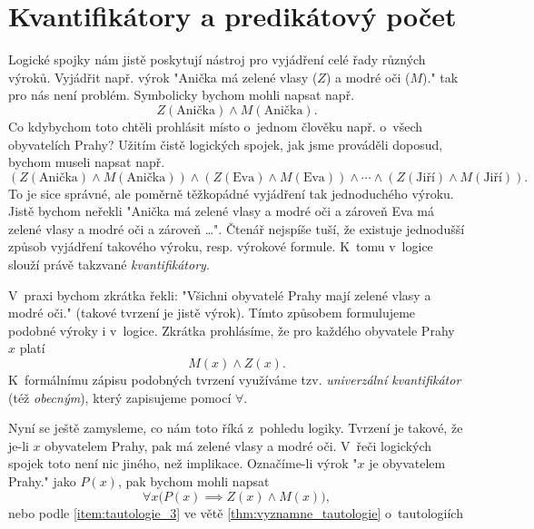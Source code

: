 \section{Kvantifikátory a predikátový počet}\label{sec:kvantifikatory_a_pred_pocet}

Logické spojky nám jistě poskytují nástroj pro vyjádření celé řady různých výroků. Vyjádřit např. výrok "Anička má zelené vlasy ($Z$) a modré oči ($M$)." tak pro nás není problém. Symbolicky bychom mohli napsat např.
\begin{equation*}
    Z({\text{Anička}}) \land M({\text{Anička}}).
\end{equation*}
Co kdybychom toto chtěli prohlásit místo o~jednom člověku např. o~všech obyvatelích Prahy? Užitím čistě logických spojek, jak jsme prováděli doposud, bychom museli napsat např.
\begin{equation*}
    (Z({\text{Anička}}) \land M({\text{Anička}})) \land (Z({\text{Eva}}) \land M({\text{Eva}})) \land \cdots \land (Z({\text{Jiří}}) \land M({\text{Jiří}})).
\end{equation*}
To je sice správné, ale poměrně těžkopádné vyjádření tak jednoduchého výroku. Jistě bychom neřekli "Anička má zelené vlasy a modré oči a zároveň Eva má zelené vlasy a modré oči a zároveň \dots". Čtenář nejspíše tuší, že existuje jednodušší způsob vyjádření takového výroku, resp. výrokové formule. K~tomu v~logice slouží právě takzvané \emph{kvantifikátory}.\par
V~praxi bychom zkrátka řekli: "Všichni obyvatelé Prahy mají zelené vlasy a modré oči." (takové tvrzení je jistě výrok). Tímto způsobem formulujeme podobné výroky i v~logice. Zkrátka prohlásíme, že pro každého obyvatele Prahy $x$ platí
\begin{equation*}
    M(x) \land Z(x).
\end{equation*}
K~formálnímu zápisu podobných tvrzení využíváme tzv. \emph{univerzální kvantifikátor} (též \emph{obecným}), který zapisujeme pomocí $\forall$.\par
Nyní se ještě zamysleme, co nám toto říká z~pohledu logiky. Tvrzení je takové, že je-li $x$ obyvatelem Prahy, pak má zelené vlasy a modré oči. V~řeči logických spojek toto není nic jiného, než implikace. Označíme-li výrok "$x$ je obyvatelem Prahy." jako $P(x)$, pak bychom mohli napsat
\begin{equation}\label{eq:univ_kvatifikator_priklad}
    \forall x \bigl(P(x) \implies Z(x) \land M(x)\bigr),
\end{equation}
nebo podle \ref{item:tautologie_3} ve větě \ref{thm:vyznamne_tautologie} o~tautologiích
